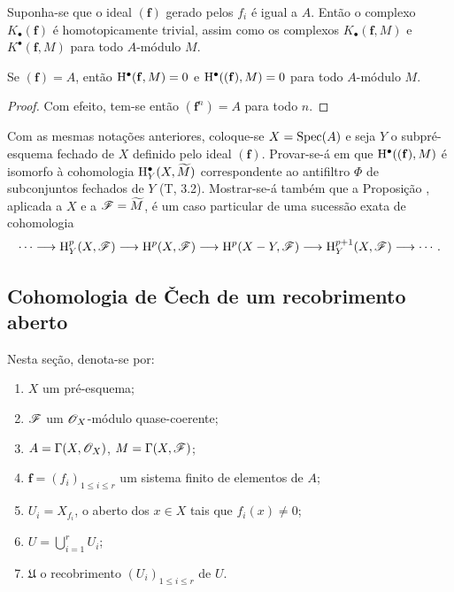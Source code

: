 \begin{proposition}[1.1.8]
\label{III.1.1.8}
Suponha-se que o ideal $(\mathbf{f})$ gerado pelos $f_i$ é igual a $A$.
Então o complexo $K_\bullet(\mathbf{f})$ é homotopicamente trivial, assim como os complexos $K_\bullet(\mathbf{f},M)$ e $K^\bullet(\mathbf{f},M)$ para todo $A$-módulo $M$.
\end{proposition}

\begin{corollary}[1.1.9]
\label{III.1.1.9}
Se $(\mathbf{f})=A$, então $\mathrm{H}^\bullet(\mathbf{f},M)=0$ e $\mathrm{H}^\bullet((\mathbf{f}),M)=0$ para todo $A$-módulo $M$.
\end{corollary}

\begin{proof}
Com efeito, tem-se então $(\mathbf{f}^n)=A$ para todo $n$.
\end{proof}

\begin{remark}[1.1.10]
\label{III.1.1.10}
Com as mesmas notações anteriores, coloque-se $X=\operatorname{Spec}(A)$ e seja $Y$ o subpré-esquema fechado de $X$ definido pelo ideal $(\mathbf{f})$.
Provar-se-á em  que $\mathrm{H}^\bullet((\mathbf{f}),M)$ é isomorfo à cohomologia $\mathrm{H}_Y^\bullet(X,\widetilde{M})$ correspondente ao antifiltro $\Phi$ de subconjuntos fechados de $Y$ (T, 3.2).
Mostrar-se-á também que a Proposição , aplicada a $X$ e a $\mathscr{F}=\widetilde{M}$, é um caso particular de uma sucessão exata de cohomologia
\[
  \cdots\to\HH_Y^p(X,\sh{F})\to\HH^p(X,\sh{F})\to\HH^p(X\setmin Y,\sh{F})\to\HH_Y^{p+1}(X,\sh{F})\to\cdots.
\]
\end{remark}

\subsection{Cohomologia de \v Cech de um recobrimento aberto}
\label{subsection:III.1.2}

\begin{notation}[1.2.1]
\label{III.1.2.1}
Nesta seção, denota-se por:
\begin{enumerate}
  \item $X$ um pré-esquema;
  \item $\mathscr{F}$ um $\mathscr{O}_X$-módulo quase-coerente;
  \item $A=\Gamma(X,\mathscr{O}_X)$, $M=\Gamma(X,\mathscr{F})$;
  \item $\mathbf{f}=(f_i)_{1\leq i\leq r}$ um sistema finito de elementos de $A$;
  \item $U_i=X_{f_i}$, o aberto  dos $x\in X$ tais que $f_i(x)\neq 0$;
  \item $U=\bigcup_{i=1}^r U_i$;
  \item $\mathfrak{U}$ o recobrimento $(U_i)_{1\leq i\leq r}$ de $U$.
\end{enumerate}
\end{notation}

